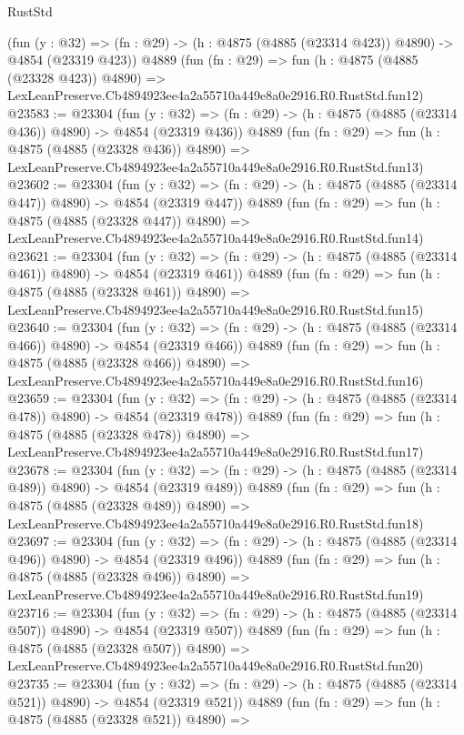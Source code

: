 \begin{lexlean}{RustStd}
\begin{coremodule}
    (fun (y : @32) => (fn : @29) -> (h : @4875 (@4885 (@23314 @423)) @4890) -> @4854 (@23319 @423))
    @4889
    (fun (fn : @29) =>
    fun (h : @4875 (@4885 (@23328 @423)) @4890) =>
    LexLeanPreserve.Cb4894923ee4a2a55710a449e8a0e2916.R0.RustStd.fun12)
@23583 := @23304
    (fun (y : @32) => (fn : @29) -> (h : @4875 (@4885 (@23314 @436)) @4890) -> @4854 (@23319 @436))
    @4889
    (fun (fn : @29) =>
    fun (h : @4875 (@4885 (@23328 @436)) @4890) =>
    LexLeanPreserve.Cb4894923ee4a2a55710a449e8a0e2916.R0.RustStd.fun13)
@23602 := @23304
    (fun (y : @32) => (fn : @29) -> (h : @4875 (@4885 (@23314 @447)) @4890) -> @4854 (@23319 @447))
    @4889
    (fun (fn : @29) =>
    fun (h : @4875 (@4885 (@23328 @447)) @4890) =>
    LexLeanPreserve.Cb4894923ee4a2a55710a449e8a0e2916.R0.RustStd.fun14)
@23621 := @23304
    (fun (y : @32) => (fn : @29) -> (h : @4875 (@4885 (@23314 @461)) @4890) -> @4854 (@23319 @461))
    @4889
    (fun (fn : @29) =>
    fun (h : @4875 (@4885 (@23328 @461)) @4890) =>
    LexLeanPreserve.Cb4894923ee4a2a55710a449e8a0e2916.R0.RustStd.fun15)
@23640 := @23304
    (fun (y : @32) => (fn : @29) -> (h : @4875 (@4885 (@23314 @466)) @4890) -> @4854 (@23319 @466))
    @4889
    (fun (fn : @29) =>
    fun (h : @4875 (@4885 (@23328 @466)) @4890) =>
    LexLeanPreserve.Cb4894923ee4a2a55710a449e8a0e2916.R0.RustStd.fun16)
@23659 := @23304
    (fun (y : @32) => (fn : @29) -> (h : @4875 (@4885 (@23314 @478)) @4890) -> @4854 (@23319 @478))
    @4889
    (fun (fn : @29) =>
    fun (h : @4875 (@4885 (@23328 @478)) @4890) =>
    LexLeanPreserve.Cb4894923ee4a2a55710a449e8a0e2916.R0.RustStd.fun17)
@23678 := @23304
    (fun (y : @32) => (fn : @29) -> (h : @4875 (@4885 (@23314 @489)) @4890) -> @4854 (@23319 @489))
    @4889
    (fun (fn : @29) =>
    fun (h : @4875 (@4885 (@23328 @489)) @4890) =>
    LexLeanPreserve.Cb4894923ee4a2a55710a449e8a0e2916.R0.RustStd.fun18)
@23697 := @23304
    (fun (y : @32) => (fn : @29) -> (h : @4875 (@4885 (@23314 @496)) @4890) -> @4854 (@23319 @496))
    @4889
    (fun (fn : @29) =>
    fun (h : @4875 (@4885 (@23328 @496)) @4890) =>
    LexLeanPreserve.Cb4894923ee4a2a55710a449e8a0e2916.R0.RustStd.fun19)
@23716 := @23304
    (fun (y : @32) => (fn : @29) -> (h : @4875 (@4885 (@23314 @507)) @4890) -> @4854 (@23319 @507))
    @4889
    (fun (fn : @29) =>
    fun (h : @4875 (@4885 (@23328 @507)) @4890) =>
    LexLeanPreserve.Cb4894923ee4a2a55710a449e8a0e2916.R0.RustStd.fun20)
@23735 := @23304
    (fun (y : @32) => (fn : @29) -> (h : @4875 (@4885 (@23314 @521)) @4890) -> @4854 (@23319 @521))
    @4889
    (fun (fn : @29) =>
    fun (h : @4875 (@4885 (@23328 @521)) @4890) =>

\end{coremodule}
\end{lexlean}
